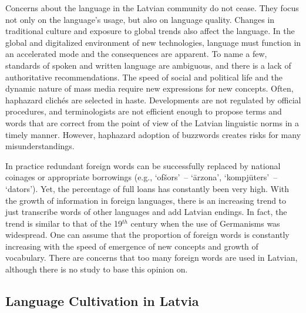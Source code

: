 \begin{multicols}{2}
Concerns about the language in the Latvian community do not cease.
They focus not only on the language's usage, but also on language quality.
Changes in traditional culture and exposure to global trends also affect the language.
In the global and digitalized environment of new technologies, language must function in an accelerated mode and the consequences are apparent.
To name a few, standards of spoken and written language are ambiguous, and there is a lack of authoritative recommendations.
The speed of social and political life and the dynamic nature of mass media require new expressions for new concepts.
Often, haphazard clichés are selected in haste.
Developments are not regulated by official procedures, and terminologists are not efficient enough to propose terms and words that are correct from the point of view of the Latvian linguistic norms in a timely manner.
However, haphazard adoption of buzzwords creates risks for many misunderstandings.

In practice redundant foreign words can be successfully replaced by national coinages or appropriate borrowings (e.g., `ofšors'~-- `ārzona', `kompjūters'~-- `dators').
Yet, the percentage of full loans has constantly been very high.
With the growth of information in foreign languages, there is an increasing trend to just transcribe words of other languages and add Latvian endings.
In fact, the trend is similar to that of the 19${}^{th}$ century when the use of Germanisms was widespread.
One can assume that the proportion of foreign words is constantly increasing with the speed of emergence of new concepts and growth of vocabulary.
There are concerns that too many foreign words are used in Latvian, although there is no study to base this opinion on.

\subsection{Language Cultivation in Latvia}


\end{multicols}
